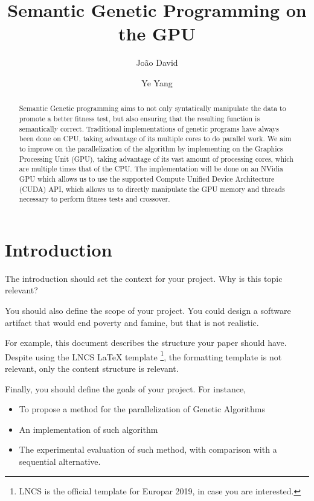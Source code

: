 \documentclass[runningheads]{llncs}
\begin{document}
\title{Semantic Genetic Programming on the GPU}
\author{João David \and
Ye Yang
}


\maketitle

\begin{abstract}
Semantic Genetic programming aims to not only syntatically manipulate the data to promote a better fitness test, but also ensuring that the resulting function is semantically correct. Traditional implementations of genetic programs have always been done on CPU, taking advantage of its multiple cores to do parallel work. We aim to improve on the parallelization of the algorithm by implementing on the Graphics Processing Unit (GPU), taking advantage of its vast amount of processing cores, which are multiple times that of the CPU. The implementation will be done on an NVidia GPU which allows us to use the supported Compute Unified Device Architecture (CUDA) API, which allows us to directly manipulate the GPU memory and threads necessary to perform fitness tests and crossover.

\end{abstract}
%
%
%
\section{Introduction}


The introduction should set the context for your project. Why is this topic relevant?

You should also define the scope of your project. You could design a software artifact that would end poverty and famine, but that is not realistic.

For example, this document describes the structure your paper should have. Despite using the LNCS LaTeX template \footnote{LNCS is the official template for Europar 2019, in case you are interested.}, the formatting template is not relevant, only the content structure is relevant.

Finally, you should define the goals of your project. For instance,

\begin{itemize}
	\item To propose a method for the parallelization of Genetic Algorithms
	\item An implementation of such algorithm
	\item The experimental evaluation of such method, with comparison with a sequential alternative.
\end{itemize}
\end{document}
